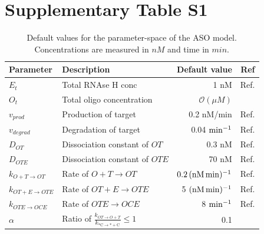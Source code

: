 \documentclass[a4paper,11pt]{article}
\begin{document}
\section{Supplementary Table S1}
\begin{table}[!h]
\caption{Default values for the parameter-space of the ASO model. Concentrations are measured in $nM$ and time in $min$.}\label{tb::par}
\setlength\extrarowheight{5pt}  %
\begin{tabular}{| l | l | r | r |}
\hline
Parameter & Description &Default value & Ref  \\
\hline
$E_t$ & Total RNAse H conc & 1 nM & Ref. \cite{Amirkhanov:2002vo}\\
$O_t$ & Total oligo concentration & $\mathcal{O}(\mu M )$ & {}\\
$v_{prod}$ & Production of target & 0.2 nM/min & Ref. \cite{lodish2008molecular}\\
$v_{degrad}$ & Degradation of target & 0.04 $\rm{min}^{-1}$ & Ref. \cite{Yang:2003ja}\\
$D_{OT}$ & Dissociation constant of $OT$ & 0.3 nM & Ref. \cite{Christensen:2001te} \\
$D_{OTE}$ & Dissociation constant of $OTE$  & 70 nM & Ref. \cite{Amirkhanov:2002vo} \\
$k_{O+T \to OT }$ & Rate of $O+T \to OT$ & $0.2 \, (\rm{nM \,min})^{-1}$ & Ref. \cite{Christensen:2001te}\\
$k_{OT+E \to OTE}$ & Rate of $OT+E \to OTE$  & 5 $(\rm{nM \,min})^{-1}$ & Ref. \cite{Amirkhanov:2002vo}\\
$k_{OTE \to OCE}$ & Rate of $OTE \to OCE$  & 8 $\rm{min}^{-1}$ & Ref. \cite{Amirkhanov:2002vo}\\
$\alpha$ & Ratio of $\frac{k_{OT \to O+T}}{k_{\mathrm{*C \to *+C}}} \le 1$ & 0.1  & {}\\
\hline
\end{tabular}
\end{table}
\end{document}

